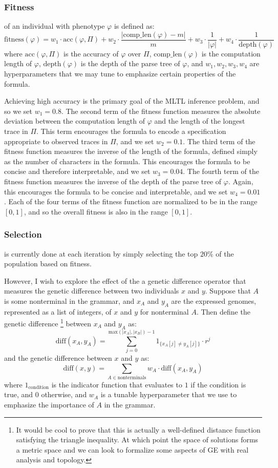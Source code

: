 \documentclass[runningheads]{llncs}
\renewcommand{\phi}{\varphi}
\begin{document}
\subsubsection{Fitness} of an individual with phenotype $\phi$ is defined as:
$$\text{fitness}(\phi) = 
w_1 \cdot \text{acc}(\phi, \Pi) + 
w_2 \cdot \frac{|\text{comp\_len}(\phi)-m|}{m} + 
w_3 \cdot \frac{1}{|\phi|} + 
w_4 \cdot \frac{1}{\text{depth}(\phi)}$$
where $\text{acc}(\phi, \Pi)$ is the accuracy of $\phi$ over $\Pi$, $\text{comp\_len}(\phi)$ is the computation length of $\phi$, $\text{depth}(\phi)$ is the depth of the parse tree of $\phi$, and $w_1, w_2, w_3, w_4$ are hyperparameters that we may tune to emphasize certain properties of the formula.

Achieving high accuracy is the primary goal of the MLTL inference problem, and so we set $w_1 = 0.8$. 
The second term of the fitness function measures the absolute deviation between the computation length of $\phi$ and the length of the longest trace in $\Pi$. 
This term encourages the formula to encode a specification appropriate to observed traces in $\Pi$, and we set $w_2 = 0.1$.
The third term of the fitness function measures the inverse of the length of the formula, defined simply as the number of characters in the formula.
This encourages the formula to be concise and therefore interpretable, and we set $w_3 = 0.04$.  
The fourth term of the fitness function measures the inverse of the depth of the parse tree of $\phi$.
Again, this encourages the formula to be concise and interpretable, and we set $w_4 = 0.01$.
Each of the four terms of the fitness function are normalized to be in the range $[0, 1]$, and so the overall fitness is also in the range $[0, 1]$.

\subsubsection{Selection}
is currently done at each iteration by simply selecting the top $20\%$ of the population based on fitness. 

However, I wish to explore the effect of the a genetic difference operator that measures the genetic difference between two individuals $x$ and $y$. 
Suppose that $A$ is some nonterminal in the grammar, and $x_A$ and $y_A$ are the expressed genomes, represented as a list of integers, of $x$ and $y$ for nonterminal $A$. 
Then define the genetic difference \footnote{It would be cool to prove that this is actually a well-defined distance function satisfying the triangle inequality. At which point the space of solutions forms a metric space and we can look to formalize some aspects of GE with real analysis and topology.}
between $x_A$ and $y_A$ as:
$$
\text{diff}(x_A, y_A) =
\sum_{j = 0}^{\text{max}(|x_A|, |x_B|)-1}
1_{\{x_A[j] \neq y_A[j]\}} \cdot r^j
$$
and the genetic difference between $x$ and $y$ as:
$$
\text{diff}(x, y) =
\sum_{A \in \text{nonterminals}}
w_A \cdot \text{diff}(x_A, y_A)
$$
where $1_{\text{condition}}$ is the indicator function that evaluates to $1$ if the condition is true, and $0$ otherwise, and $w_A$ is a tunable hyperparameter that we use to emphasize the importance of $A$ in the grammar.
\end{document}
